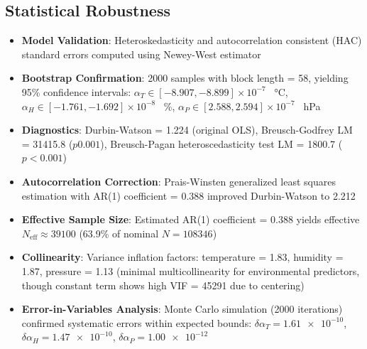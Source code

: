 \documentclass[aip,reprint,groupedaddress,onecolumn,superscriptaddress]{revtex4-2}
\begin{document}
\subsection{Statistical Robustness}
\begin{itemize}
    \item \textbf{Model Validation}: Heteroskedasticity and autocorrelation consistent (HAC) standard errors computed using Newey-West estimator
    \item \textbf{Bootstrap Confirmation}: \num{2000} samples with block length = \num{58}, yielding 95\% confidence intervals: $\alpha_T \in [-8.907, -8.899] \times 10^{-7}$ \si{\per\degreeCelsius}, $\alpha_H \in [-1.761, -1.692] \times 10^{-8}$ \si{\per\percent}, $\alpha_P \in [2.588, 2.594] \times 10^{-7}$ \si{\per\hecto\pascal}
    \item \textbf{Diagnostics}: Durbin-Watson = \num{1.224} (original OLS), Breusch-Godfrey LM = \num{31415.8} ($p \num{0.001}$), Breusch-Pagan heteroscedasticity test LM = \num{1800.7} ($p < \num{0.001}$)
    \item \textbf{Autocorrelation Correction}: Prais-Winsten generalized least squares estimation with AR(1) coefficient = \num{0.388} improved Durbin-Watson to \num{2.212}
    \item \textbf{Effective Sample Size}: Estimated AR(1) coefficient = \num{0.388} yields effective $N_{\text{eff}} \approx \num{39100}$ (63.9\% of nominal $N = \num{108346}$)
    \item \textbf{Collinearity}: Variance inflation factors: temperature = \num{1.83}, humidity = \num{1.87}, pressure = \num{1.13} (minimal multicollinearity for environmental predictors, though constant term shows high VIF = \num{45291} due to centering)
    \item \textbf{Error-in-Variables Analysis}: Monte Carlo simulation (\num{2000} iterations) confirmed systematic errors within expected bounds: $\delta\alpha_T = \num{1.61e-10}$, $\delta\alpha_H = \num{1.47e-10}$, $\delta\alpha_P = \num{1.00e-12}$
\end{itemize}


\end{document}
